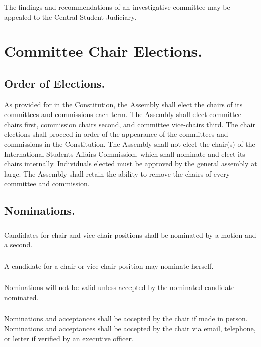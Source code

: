 \documentclass{rules}
\begin{document}
\subsubsection{}
The findings and recommendations of an investigative committee may be appealed to the Central Student Judiciary.

\section{Committee Chair Elections.}
\subsection{Order of Elections.}
As provided for in the Constitution, the Assembly shall elect the chairs of its committees and commissions each term.  The Assembly shall elect committee chairs first, commission chairs second, and committee vice-chairs third.  The chair elections shall proceed in order of the appearance of the committees and commissions in the Constitution.  The Assembly shall not elect the chair(s) of the International Students Affairs Commission, which shall nominate and elect its chairs internally.  Individuals elected must be approved by the general assembly at large.  The Assembly shall retain the ability to remove the chairs of every committee and commission.
\subsection{Nominations.}
\subsubsection{}
Candidates for chair and vice-chair positions shall be nominated by a motion and a second.
\subsubsection{}
A candidate for a chair or vice-chair position may nominate herself.
\subsubsection{}
Nominations will not be valid unless accepted by the nominated candidate nominated. 
\subsubsection{}
Nominations and acceptances shall be accepted by the chair if made in person.  Nominations and acceptances shall be accepted by the chair via email, telephone, or letter if verified by an executive officer.
\end{document}
